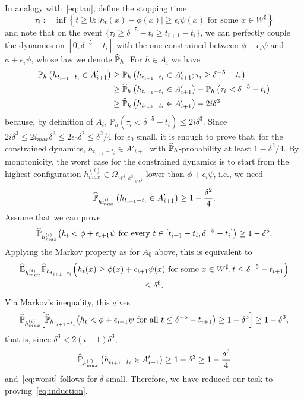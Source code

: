 \documentclass[AHL,Unicode,longabstracts,published]{cedram}
\newcommand{\E}{\mathbb{E}}
\renewcommand{\P}{\mathbb{P}}
\newcommand{\eps}{\epsilon}
\renewcommand{\d}{{\sharp }}
\let\oldhat\hat
\renewcommand*{\hat}[1]{\mathchoice{\widehat{#1}}{\widehat{#1}}{\oldhat{#1}}{\oldhat{#1}}}
\begin{document}
In analogy with~\eqref{eq:tau}, define the stopping time
\begin{equation}\label{eq:taui}
\tau_i:=\inf\left\{t\ge0:|h_t(x)-\phi(x)|\geq \epsilon_{i}\psi(x) \text{ for some } x\in W^\d\right\}
\end{equation}
and note that on the event $\{\tau_i\ge \delta^{-5}-t_i\ge t_{i+1}-t_i\}$, we can perfectly couple the dynamics on $[0,\delta^{-5}-t_i] $ with the one constrained between $\phi-\epsilon_i\psi$ and $\phi+\epsilon_i\psi$, whose law we denote $\hat\P_h$. For $h\in A_i$ we have
\begin{equation}
\begin{split}
\P_h\left(h_{t_{i+1}-t_i}\in A'_{i+1}\right) &\ge \P_h\left(h_{t_{i+1}-t_i}\in A'_{i+1};\tau_i \ge\delta^{-5}-t_i\right)\\
&\ge\hat \P_h\left(h_{t_{i+1}-t_i}\in A'_{i+1}\right) - \P_h\left(\tau_i < \delta^{-5}-t_i\right)\\
&\ge \hat \P_h\left(h_{t_{i+1}-t_i}\in A'_{i+1}\right)-2i\delta^3
\end{split}
\end{equation}
because, by definition of $A_i$, $\P_h(\tau_i<\delta^{-5}-t_i)\le 2i\delta^3$. Since $2i\delta^3\le 2i_{max}\delta^3\le 2\epsilon_0\delta^2\le \delta^2/4$ for $\epsilon_0$ small, it is enough to prove that, for the constrained dynamics, $h_{t_{i+1} - t_i} \in A'_{i+1}$ with $\hat\P_h$-probability at least $1-\delta^2/4$. By monotonicity, the worst case for the constrained dynamics is to start from the highest configuration $h^{(i)}_{max}\in \Omega_{W^\d,\phi^\d|_{\partial W^\d}}$ lower than $\phi + \eps_i \psi$, i.e., we need
\begin{equation}\label{eq:worst}
\hat \P_{h^{(i)}_{max}}\left(h_{t_{i+1}-t_i}\in A'_{i+1}\right)\ge 1-\frac{\delta^2}4.
\end{equation}
Assume that we can prove
\begin{equation}\label{eq:induction}
\hat\P_{h^{(i)}_{max}} \big(h_t < \phi + \eps_{i+1} \psi \text{ for every } t\in [t_{i+1} - t_i, \delta^{-5}- t_i]\big)\\
\geq 1 - \delta^6.
\end{equation}
Applying the Markov property as for $A_0$ above, this is equivalent to
\begin{multline}
\hat \E_{h^{(i)}_{max}}\hat \P_{h_{t_{i+1}-t_i}}\Big(h_t(x)\ge \phi(x)+\epsilon_{i+1}\psi(x) \text{ for some } x\in W^\d, t\le \delta^{-5}-{t_{i+1}}\Big)\\
\leq \delta^6.
\end{multline}
Via Markov's inequality, this gives
\begin{equation}
\hat \P_{h^{(i)}_{max}}\Big[\hat\P_{h_{t_{i+1}-t_i}}\big(h_t<\phi+\epsilon_{i+1}\psi \text{ for all } t\le \delta^{-5}-{t_{i+1}}\big)\ge 1-\delta^3\Big]\ge 1-\delta^3,
\end{equation}
that is, since $\delta^3< 2(i+1)\delta^3$,
\begin{equation}
\hat \P_{h^{(i)}_{max}}\left(h_{t_{i+1}-t_i}\in A'_{i+1}\right)\ge 1-\delta^3\ge1-\frac{\delta^2}4
\end{equation}
and~\eqref{eq:worst} follows for $\delta$ small. Therefore, we have reduced our task to proving~\eqref{eq:induction}.
\end{document}
